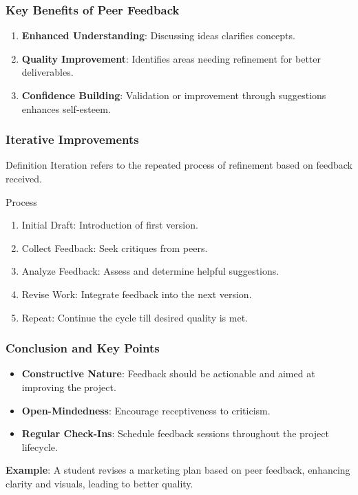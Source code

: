\documentclass[aspectratio=169]{beamer}
\begin{document}
\begin{frame}[fragile]
    \frametitle{Key Benefits of Peer Feedback}
    \begin{enumerate}
        \item \textbf{Enhanced Understanding}: Discussing ideas clarifies concepts.
        \item \textbf{Quality Improvement}: Identifies areas needing refinement for better deliverables.
        \item \textbf{Confidence Building}: Validation or improvement through suggestions enhances self-esteem.
    \end{enumerate}
\end{frame}

\begin{frame}[fragile]
    \frametitle{Iterative Improvements}
    \begin{block}{Definition}
        Iteration refers to the repeated process of refinement based on feedback received.
    \end{block}
    \begin{block}{Process}
        \begin{enumerate}
            \item Initial Draft: Introduction of first version.
            \item Collect Feedback: Seek critiques from peers.
            \item Analyze Feedback: Assess and determine helpful suggestions.
            \item Revise Work: Integrate feedback into the next version.
            \item Repeat: Continue the cycle till desired quality is met.
        \end{enumerate}
    \end{block}
\end{frame}

\begin{frame}[fragile]
    \frametitle{Conclusion and Key Points}
    \begin{itemize}
        \item \textbf{Constructive Nature}: Feedback should be actionable and aimed at improving the project.
        \item \textbf{Open-Mindedness}: Encourage receptiveness to criticism.
        \item \textbf{Regular Check-Ins}: Schedule feedback sessions throughout the project lifecycle.
    \end{itemize}
    \textbf{Example}: A student revises a marketing plan based on peer feedback, enhancing clarity and visuals, leading to better quality.
\end{frame}
\end{document}
